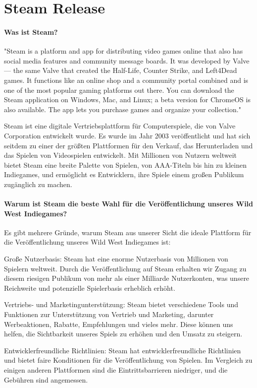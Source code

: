 
\chapter{Steam Release}\label{ch:steamrelease}
\renewcommand{\kapitelautor}{Autor: Nils} %

%
\subsubsection{Was ist Steam?}\label{subsubsec:Steam-Vorstellung}
"Steam is a platform and app for distributing video games online that also has social media features and community message boards.
It was developed by Valve — the same Valve that created the Half-Life, Counter Strike, and Left4Dead games.
It functions like an online shop and a community portal combined and is one of the most popular gaming platforms out there.
You can download the Steam application on Windows, Mac, and Linux; a beta version for ChromeOS is also available.
The app lets you purchase games and organize your collection."

Steam ist eine digitale Vertriebsplattform für Computerspiele, die von Valve Corporation entwickelt wurde.
Es wurde im Jahr 2003 veröffentlicht und hat sich seitdem zu einer der größten Plattformen für den Verkauf, das Herunterladen und das Spielen von Videospielen entwickelt.
Mit Millionen von Nutzern weltweit bietet Steam eine breite Palette von Spielen, von AAA-Titeln bis hin zu kleinen Indiegames, und ermöglicht es Entwicklern, ihre Spiele einem großen Publikum zugänglich zu machen.

\subsubsection{Warum ist Steam die beste Wahl für die Veröffentlichung unseres Wild West Indiegames?}\label{subsubsec:Warum-Steam}

Es gibt mehrere Gründe, warum Steam aus unserer Sicht die ideale Plattform für die Veröffentlichung unseres Wild West Indiegames ist:

\begin{liste}
   \item Große Nutzerbasis: Steam hat eine enorme Nutzerbasis von Millionen von Spielern weltweit. Durch die Veröffentlichung auf Steam erhalten wir Zugang zu diesem riesigen Publikum von mehr als einer Milliarde Nutzerkonten, was unsere Reichweite und potenzielle Spielerbasis erheblich erhöht.
   \item Vertriebs- und Marketingunterstützung: Steam bietet verschiedene Tools und Funktionen zur Unterstützung von Vertrieb und Marketing, darunter Werbeaktionen, Rabatte, Empfehlungen und vieles mehr. Diese können uns helfen, die Sichtbarkeit unseres Spiels zu erhöhen und den Umsatz zu steigern.
   \item Entwicklerfreundliche Richtlinien: Steam hat entwicklerfreundliche Richtlinien und bietet faire Konditionen für die Veröffentlichung von Spielen. Im Vergleich zu einigen anderen Plattformen sind die Eintrittsbarrieren niedriger, und die Gebühren sind angemessen.
\end{liste}

